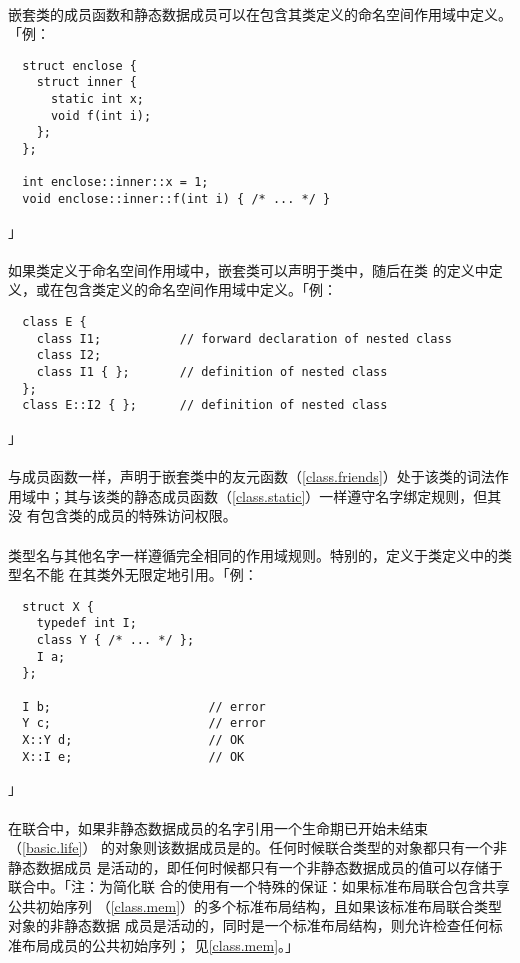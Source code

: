 \paragraph{}
嵌套类的成员函数和静态数据成员可以在包含其类定义的命名空间作用域中定义。「例：
\begin{lstlisting}
  struct enclose {
    struct inner {
      static int x;
      void f(int i);
    };
  };

  int enclose::inner::x = 1;
  void enclose::inner::f(int i) { /* ... */ }
\end{lstlisting}」

\paragraph{}
如果类定义于命名空间作用域中，嵌套类可以声明于类中，随后在类
的定义中定义，或在包含类定义的命名空间作用域中定义。「例：
\begin{lstlisting}
  class E {
    class I1;           // forward declaration of nested class
    class I2;
    class I1 { };       // definition of nested class
  };
  class E::I2 { };      // definition of nested class
\end{lstlisting}」

\paragraph{}
与成员函数一样，声明于嵌套类中的友元函数（\ref{class.friends}）处于该类的词法作
用域中；其与该类的静态成员函数（\ref{class.static}）一样遵守名字绑定规则，但其没
有包含类的成员的特殊访问权限。

\paragraph{}
类型名与其他名字一样遵循完全相同的作用域规则。特别的，定义于类定义中的类型名不能
在其类外无限定地引用。「例：
\begin{lstlisting}
  struct X {
    typedef int I;
    class Y { /* ... */ };
    I a;
  };

  I b;                      // error
  Y c;                      // error
  X::Y d;                   // OK
  X::I e;                   // OK
\end{lstlisting}」

\paragraph{}
在联合中，如果非静态数据成员的名字引用一个生命期已开始未结束（\ref{basic.life}）
的对象则该数据成员是的。任何时候联合类型的对象都只有一个非静态数据成员
是活动的，即任何时候都只有一个非静态数据成员的值可以存储于联合中。「注：为简化联
合的使用有一个特殊的保证：如果标准布局联合包含共享公共初始序列
（\ref{class.mem}）的多个标准布局结构，且如果该标准布局联合类型对象的非静态数据
成员是活动的，同时是一个标准布局结构，则允许检查任何标准布局成员的公共初始序列；
见\ref{class.mem}。」

